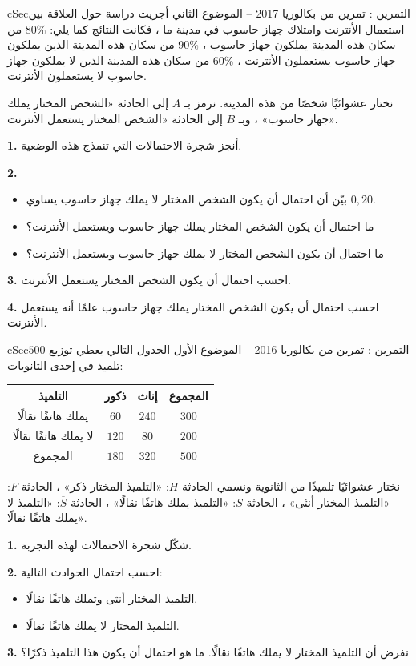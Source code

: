\documentclass[12pt,a4paper]{article}
\newenvironment{BOX}[2]{\begin{otherlanguage}{english}\begin{arbox}{#1}{#2}}{\end{arbox}\end{otherlanguage}}
\newcounter{exo}
\newenvironment{tamrin}[1]{\stepcounter{exo}\begin{BOX}{cSec}{التمرين \theexo: #1}}{\end{BOX}}
\newenvironment{LTR}{\begin{otherlanguage}{english}}{\end{otherlanguage}}
\newcommand{\ar}[1]{\foreignlanguage{arabic}{#1}}
\newenvironment{sq}{\begin{itemize}[leftmargin=2.4em,itemsep=3pt]}{\end{itemize}}
\newcommand{\qa}{\item[(أ)]}\newcommand{\qb}{\item[(ب)]}\newcommand{\qc}{\item[(جـ)]}\newcommand{\qd}{\item[(د)]}\newcommand{\qe}{\item[(هـ)]}
\newcommand{\QQ}[1]{\par\smallskip\textbf{#1.} }
\begin{document}
\begin{tamrin}{تمرين من بكالوريا 2017 -- الموضوع الثاني}
أجريت دراسة حول العلاقة بين استعمال الأنترنت وامتلاك جهاز حاسوب في مدينة ما ، فكانت النتائج كما يلي: $80\%$ من سكان هذه المدينة يملكون جهاز حاسوب ، $90\%$ من سكان هذه المدينة الذين يملكون جهاز حاسوب يستعملون الأنترنت ، $60\%$ من سكان هذه المدينة الذين لا يملكون جهاز حاسوب لا يستعملون الأنترنت.
\par نختار عشوائيًا شخصًا من هذه المدينة. نرمز بـ $A$ إلى الحادثة «الشخص المختار يملك جهاز حاسوب» ، وبـ $B$ إلى الحادثة «الشخص المختار يستعمل الأنترنت».
\QQ{1} أنجز شجرة الاحتمالات التي تنمذج هذه الوضعية.
\QQ{2}
\begin{sq}
\qa بيّن أن احتمال أن يكون الشخص المختار لا يملك جهاز حاسوب يساوي $0{,}20$.
\qb ما احتمال أن يكون الشخص المختار يملك جهاز حاسوب ويستعمل الأنترنت؟
\qc ما احتمال أن يكون الشخص المختار لا يملك جهاز حاسوب ويستعمل الأنترنت؟
\end{sq}
\QQ{3} احسب احتمال أن يكون الشخص المختار يستعمل الأنترنت.
\QQ{4} احسب احتمال أن يكون الشخص المختار يملك جهاز حاسوب علمًا أنه يستعمل الأنترنت.
\end{tamrin}
\begin{tamrin}{تمرين من بكالوريا 2016 -- الموضوع الأول}
الجدول التالي يعطي توزيع $500$ تلميذ في إحدى الثانويات:
\begin{center}\begin{LTR}\renewcommand{\arraystretch}{1.4}
\begin{tabular}{|C|c|c|c|}\hline
{}التلميذ & \ar{ذكور} & \ar{إناث} & \ar{المجموع}\\\hline
يملك هاتفًا نقالًا & $60$ & $240$ & $300$\\\hline
لا يملك هاتفًا نقالًا & $120$ & $80$ & $200$\\\hline
المجموع & $180$ & $320$ & $500$\\\hline
\end{tabular}\end{LTR}\end{center}
نختار عشوائيًا تلميذًا من الثانوية ونسمي الحادثة $H$: «التلميذ المختار ذكر» ، الحادثة $F$: «التلميذ المختار أنثى» ، الحادثة $S$: «التلميذ يملك هاتفًا نقالًا» ، الحادثة $\overline S$: «التلميذ لا يملك هاتفًا نقالًا».
\QQ{1} شكّل شجرة الاحتمالات لهذه التجربة.
\QQ{2} احسب احتمال الحوادث التالية:
\begin{sq}
\qa التلميذ المختار أنثى وتملك هاتفًا نقالًا.
\qb التلميذ المختار لا يملك هاتفًا نقالًا.
\end{sq}
\QQ{3} نفرض أن التلميذ المختار لا يملك هاتفًا نقالًا. ما هو احتمال أن يكون هذا التلميذ ذكرًا؟
\end{tamrin}
\end{document}
